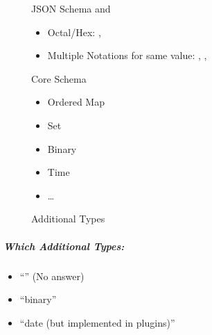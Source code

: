 \begin{figure}[H]
  \begin{minipage}[t]{0.48\textwidth}
    \vspace{0pt}
    \begin{bchart}[max=9, width=0.85\textwidth]
    \end{bchart}
  \end{minipage}
  \begin{minipage}[t]{0.48\textwidth}
    \vspace{0pt}
    \gls{JSON} Schema and
      \vspace{-0.5cm}
      \begin{itemize}
        \item Octal/Hex: , 
        \item Multiple Notations for same value:
              , , \yaml{~}
      \end{itemize}
  \end{minipage}
  \caption{Core Schema}
\end{figure}

\begin{figure}[H]
  \begin{minipage}[t]{0.48\textwidth}
    \vspace{0pt}
    \begin{bchart}[max=9, width=0.85\textwidth]
    \end{bchart}
  \end{minipage}
  \begin{minipage}[t]{0.48\textwidth}
    \vspace{0pt}
    \begin{itemize}
      \item Ordered Map
      \item Set
      \item Binary
      \item Time
      \item …
    \end{itemize}
  \end{minipage}
  \caption{Additional Types}
\end{figure}

\subparagraph{Which Additional Types:}
\begin{itemize}
  \item “” (No answer)
  \item “binary”
  \item “date (but implemented in plugins)”
\end{itemize}

